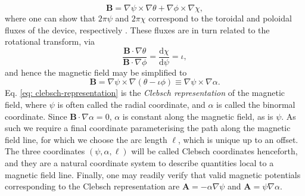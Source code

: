 \begin{equation}
    \boldsymbol{B} = \nabla \psi \times \nabla \theta + \nabla \phi \times \nabla \chi,
\end{equation}
where one can show that $2\pi\psi$ and $2\pi\chi$ correspond to the toroidal and poloidal fluxes of the device, respectively \cite{helander2014theory}. These fluxes are in turn related to the rotational transform, via
\begin{equation}
    \frac{\boldsymbol{B} \cdot \nabla \theta}{\boldsymbol{B} \cdot \nabla \phi}=\frac{\mathrm{d} \chi }{\mathrm{d} \psi} = \iota,
\end{equation}
and hence the magnetic field may be simplified to
\begin{equation}
    \boldsymbol{B} = \nabla \psi \times \nabla \left( \theta - \iota \phi \right) \equiv \nabla \psi \times \nabla \alpha.
    \label{eq: clebsch-representation}
\end{equation}
Eq. \eqref{eq: clebsch-representation} is the \textit{Clebsch representation} of the magnetic field, where $\psi$ is often called the radial coordinate, and $\alpha$ is called the binormal coordinate. Since $\boldsymbol{B} \cdot \nabla \alpha = 0$, $\alpha$ is constant along the magnetic field, as is $\psi$. As such we require a final coordinate parameterising the path along the magnetic field line, for which we choose the arc length $\ell$, which is unique up to an offset. The three coordinates $(\psi,\alpha,\ell)$ will be called Clebsch coordinates henceforth, and they are a natural coordinate system to describe quantities local to a magnetic field line. Finally, one may readily verify that valid magnetic potentials corresponding to the Clebsch representation are $\boldsymbol{A} = -\alpha \nabla \psi$ and $\boldsymbol{A} = \psi \nabla \alpha$. \par 
